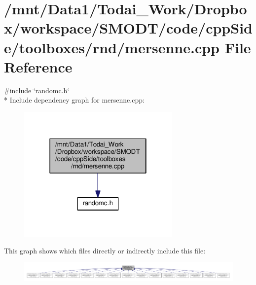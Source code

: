 \section{/mnt/\-Data1/\-Todai\-\_\-\-Work/\-Dropbox/workspace/\-S\-M\-O\-D\-T/code/cpp\-Side/toolboxes/rnd/mersenne.cpp File Reference}
\label{toolboxes_2rnd_2mersenne_8cpp}
{\ttfamily \#include \char`\"{}randomc.\-h\char`\"{}}\\*
Include dependency graph for mersenne.\-cpp\-:\nopagebreak
\begin{figure}[H]
\begin{center}
\leavevmode
\includegraphics[width=226pt]{toolboxes_2rnd_2mersenne_8cpp__incl}
\end{center}
\end{figure}
This graph shows which files directly or indirectly include this file\-:\nopagebreak
\begin{figure}[H]
\begin{center}
\leavevmode
\includegraphics[width=350pt]{toolboxes_2rnd_2mersenne_8cpp__dep__incl}
\end{center}
\end{figure}
